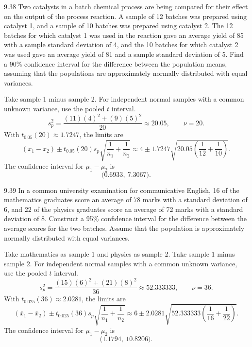 \documentclass[11pt,oneside]{article}
\begin{document}
\begin{exercise}{9.38}
Two catalysts in a batch chemical process are being compared for their effect on the output of the process reaction. A sample of 12 batches was prepared using catalyst 1, and a sample of 10 batches was prepared using catalyst 2. The 12 batches for which catalyst 1 was used in the reaction gave an average yield of 85 with a sample standard deviation of 4, and the 10 batches for which catalyst 2 was used gave an average yield of 81 and a sample standard deviation of 5. Find a 90\% confidence interval for the difference between the population means, assuming that the populations are approximately normally distributed with equal variances.
\end{exercise}
\begin{solution}
Take sample 1 minus sample 2. For independent normal samples with a common unknown variance, use the pooled $t$ interval.
\[
s_p^2=\frac{(11)(4)^2+(9)(5)^2}{20}\approx20.05,\qquad \nu=20.
\]
 With $t_{0.05}(20)\approx1.7247$, the limits are
\[
(\bar x_1-\bar x_2)\pm t_{0.05}(20)s_p\sqrt{\frac1{n_1}+\frac1{n_2}}\approx 4\pm 1.7247\sqrt{20.05\left(\frac1{12}+\frac1{10}\right)}.
\]
The confidence interval for $\mu_1-\mu_2$ is 
\[
\boxed{\bigl(0.6933,\ 7.3067\bigr)}.
\]
\end{solution}

\begin{exercise}{9.39}
In a common university examination for communicative English, 16 of the mathematics graduates score an average of 78 marks with a standard deviation of 6, and 22 of the physics graduates score an average of 72 marks with a standard deviation of 8. Construct a 95\% confidence interval for the difference between the average scores for the two batches. Assume that the population is approximately normally distributed with equal variances.
\end{exercise}
\begin{solution}
Take mathematics as sample 1 and physics as sample 2. Take sample 1 minus sample 2. For independent normal samples with a common unknown variance, use the pooled $t$ interval.
\[
s_p^2=\frac{(15)(6)^2+(21)(8)^2}{36}\approx52.333333,\qquad \nu=36.
\]
 With $t_{0.025}(36)\approx2.0281$, the limits are
\[
(\bar x_1-\bar x_2)\pm t_{0.025}(36)s_p\sqrt{\frac1{n_1}+\frac1{n_2}}\approx 6\pm 2.0281\sqrt{52.333333\left(\frac1{16}+\frac1{22}\right)}.
\]
The confidence interval for $\mu_1-\mu_2$ is 
\[
\boxed{\bigl(1.1794,\ 10.8206\bigr)}.
\]
\end{solution}
\end{document}
